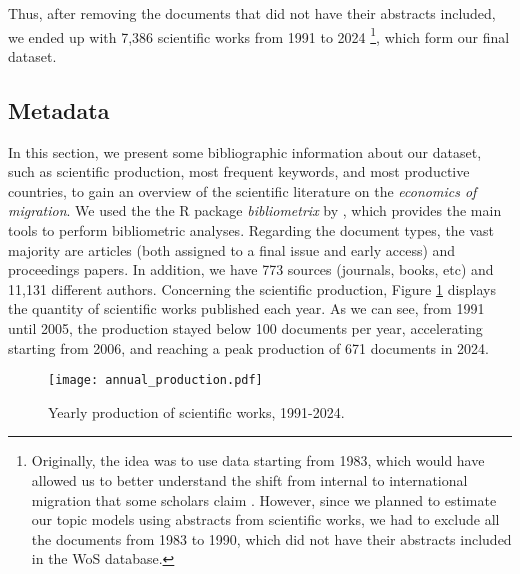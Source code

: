 Thus, after removing the documents that did not have their abstracts included, we ended up with 7,386 scientific works from 1991 to 2024 \footnote{Originally, the idea was to use data starting from 1983, which would have allowed us to better understand the shift from internal to international migration that some scholars claim \citep{cushing_crossing_2004}. However, since we planned to estimate our topic models using abstracts from scientific works, we had to exclude all the documents from 1983 to 1990, which did not have their abstracts included in the WoS database.}, which form our final dataset.

\subsection{Metadata} \label{metadata}

In this section, we present some bibliographic information about our dataset, such as scientific production, most frequent keywords, and most productive countries, to gain an overview of the scientific literature on the \textit{economics of migration}. We used the the R package \textit{bibliometrix} by \cite{aria_bibliometrix_2017}, which provides the main tools to perform bibliometric analyses. Regarding the document types, the vast majority are articles (both assigned to a final issue and early access) and proceedings papers. In addition, we have 773 sources (journals, books, etc) and 11,131 different authors. Concerning the scientific production, Figure \ref{fig:annual_production} displays the quantity of scientific works published each year. As we can see, from 1991 until 2005, the production stayed below 100 documents per year, accelerating starting from 2006, and reaching a peak production of 671 documents in 2024.

\begin{figure}[!ht]
	\centering
	\texttt{[image: annual\_production.pdf]}
	\caption{Yearly production of scientific works, 1991-2024.}
	\label{fig:annual_production}
\end{figure}

